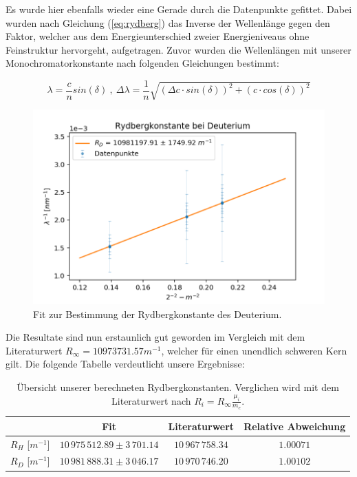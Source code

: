 \documentclass[]{article}
\begin{document}
Es wurde hier ebenfalls wieder eine Gerade durch die Datenpunkte gefittet. Dabei wurden nach Gleichung (\ref{eq:rydberg}) das Inverse der Wellenlänge gegen den Faktor, welcher aus dem Energieunterschied zweier Energieniveaus ohne Feinstruktur hervorgeht, aufgetragen. Zuvor wurden die Wellenlängen mit unserer Monochromatorkonstante nach folgenden Gleichungen bestimmt:

\begin{equation}
\lambda = \frac{c}{n} sin(\delta) \:,\: \Delta\lambda = \frac{1}{n} \sqrt{(\Delta c \cdot sin(\delta))^2 + (c\cdot cos(\delta) )^2}
\end{equation}

\begin{figure}[H]
\centering
\includegraphics[width=1\textwidth]{Plots/R_D.png}
\caption{ Fit zur Bestimmung der Rydbergkonstante des Deuterium.}
\label{fig:Rydberg D}
\end{figure}

Die Resultate sind nun erstaunlich gut geworden im Vergleich mit dem Literaturwert $R_\infty = 10973731.57 m^{-1}$, welcher für einen unendlich schweren Kern gilt. Die folgende Tabelle verdeutlicht unsere Ergebnisse:

\begin{table}[H]
	\centering
	\begin{tabular}{c|c|c|c}
		  & Fit & Literaturwert & Relative Abweichung  \\
		\hline
		$R_H$ [$m^{-1}$]& $10\,975\,512.89\pm 3\,701.14$ & $10\,967\,758.34$ & $1.00071$ \\
		\hline
		$R_D$ [$m^{-1}$]& $10\,981\,888.31\pm 3\,046.17$ & $10\,970\,746.20$ & $1.00102$ \\
	\end{tabular}
	\caption{Übersicht unserer berechneten Rydbergkonstanten. Verglichen wird mit dem Literaturwert nach $R_i = R_\infty \frac{\mu_i}{m_e}$.}
\end{table}
\end{document}
